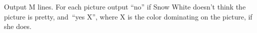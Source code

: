 Output M lines. For each picture output “no” if Snow White doesn't think the picture is pretty, and “yes X”, where X is the color dominating on the picture, if she does.